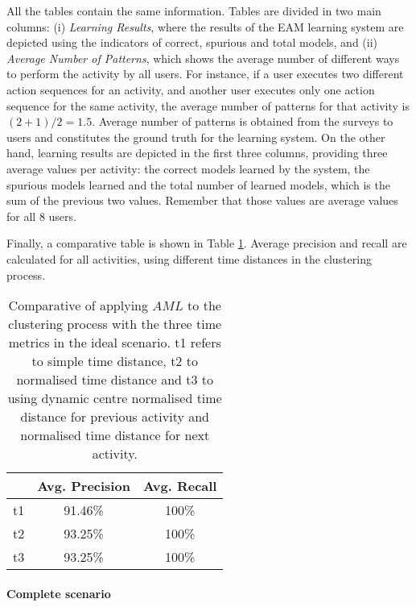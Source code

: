 All the tables contain the same information. Tables are divided in two main columns: (i) \textit{Learning Results}, where the results of the EAM learning system are depicted using the indicators of correct, spurious and total models, and (ii) \textit{Average Number of Patterns}, which shows the average number of different ways to perform the activity by all users. For instance, if a user executes two different action sequences for an activity, and another user executes only one action sequence for the same activity, the average number of patterns for that activity is $(2+1)/2 = 1.5$. Average number of patterns is obtained from the surveys to users and constitutes the ground truth for the learning system. On the other hand, learning results are depicted in the first three columns, providing three average values per activity: the correct models learned by the system, the spurious models learned and the total number of learned models, which is the sum of the previous two values. Remember that those values are average values for all 8 users.

Finally, a comparative table is shown in Table \ref{tab-aml-comparative-ideal}. Average precision and recall are calculated for all activities, using different time distances in the clustering process.

\begin{table}[htbp]\scriptsize
\begin{center}
 \begin{tabular}{ccc}
  \hline
   & Avg. Precision & Avg. Recall \\
  \hline
  t1 & 91.46\% & 100\% \\
  t2 & 93.25\% & 100\% \\
  t3 & 93.25\% & 100\% \\
  \hline
 \end{tabular}
 \caption{Comparative of applying $AML$ to the clustering process with the three time metrics in the ideal scenario. t1 refers to simple time distance, t2 to normalised time distance and t3 to using dynamic centre normalised time distance for previous activity and normalised time distance for next activity.}
 \label{tab-aml-comparative-ideal}
\end{center} 
\end{table}

\paragraph*{Complete scenario}

